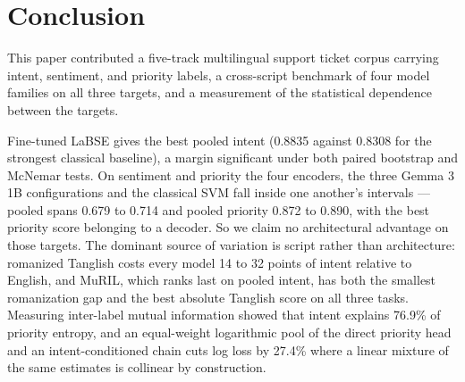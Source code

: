 \section{Conclusion}
\label{sec:conclusion}

This paper contributed a five-track multilingual support ticket corpus carrying
intent, sentiment, and priority labels, a cross-script benchmark of four model
families on all three targets, and a measurement of the statistical dependence
between the targets.

Fine-tuned LaBSE gives the best pooled intent \macrof{} (0.8835 against 0.8308
for the strongest classical baseline), a margin significant under both paired
bootstrap and McNemar tests. On sentiment and priority the four encoders, the
three Gemma 3 1B configurations and the classical SVM fall inside one another's
intervals --- pooled \negf{} spans 0.679 to 0.714 and pooled priority 0.872 to
0.890, with the best priority score belonging to a decoder. So we claim no
architectural advantage on those targets. The dominant source of variation is
script rather than architecture: romanized Tanglish costs every model 14 to 32
points of intent \macrof{} relative to English, and MuRIL, which ranks last on
pooled intent, has both the smallest romanization gap and the best absolute
Tanglish score on all three tasks. Measuring inter-label mutual information
showed that intent explains 76.9\% of priority entropy, and an equal-weight
logarithmic pool of the direct priority head and an intent-conditioned chain
cuts log loss by 27.4\% where a linear mixture of the same estimates is
collinear by construction.

